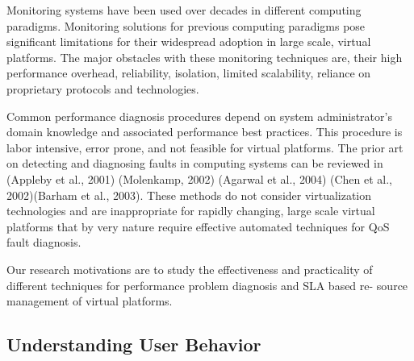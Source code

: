 Monitoring systems have been used over decades in different computing paradigms. Monitoring solutions for previous computing paradigms pose significant limitations for their widespread adoption in large scale, virtual platforms. The major obstacles with these monitoring techniques are, their high performance overhead, reliability, isolation, limited scalability, reliance on proprietary protocols and technologies.

Common performance diagnosis procedures depend on system administrator’s domain knowledge and associated performance best practices. This procedure is labor intensive, error prone, and not feasible for virtual platforms. The prior art on detecting and diagnosing faults in computing systems can be reviewed in (Appleby et al., 2001) (Molenkamp, 2002) (Agarwal et al., 2004) (Chen et al., 2002)(Barham et al., 2003). These methods do not consider virtualization technologies and are inappropriate for rapidly changing, large scale virtual platforms that by very nature require effective automated techniques for QoS fault diagnosis.

Our research motivations are to study the effectiveness and practicality of different techniques for performance problem diagnosis and SLA based re- source management of virtual platforms. 


\subsection{Understanding User Behavior}


